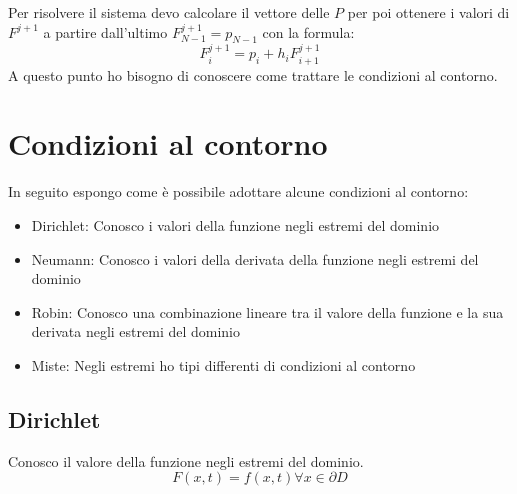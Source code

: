 \documentclass[]{article}
\numberwithin{equation}{subsection}
\begin{document}
Per risolvere il sistema devo calcolare il vettore delle $P$ per poi ottenere i valori di $F^{j+1}$ a partire dall'ultimo $F_{N-1}^{j+1} = p_{N-1}$ con la formula:
\begin{equation}
F_{i}^{j+1} = p_{i}+h_i F_{i+1}^{j+1}
\end{equation}
A questo punto ho bisogno di conoscere come trattare le condizioni al contorno.
\section{Condizioni al contorno}
In seguito espongo come \`e possibile adottare alcune condizioni al contorno:
\begin{itemize}
\item Dirichlet: Conosco i valori della funzione negli estremi del dominio
\item Neumann: Conosco i valori della derivata della funzione negli estremi del dominio
\item Robin: Conosco una combinazione lineare tra il valore della funzione e la sua derivata negli estremi del dominio
\item Miste: Negli estremi ho tipi differenti di condizioni al contorno
\end{itemize}
\subsection{Dirichlet}
Conosco il valore della funzione negli estremi del dominio.
\begin{equation}
F(x,t) = f(x,t) \forall x \in \partial D
\end{equation}
\end{document}
